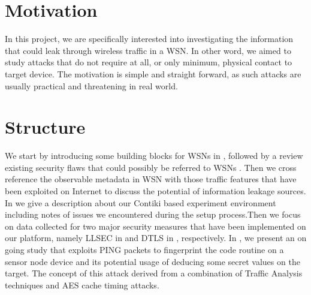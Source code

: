 \section{Motivation}
In this project, we are specifically interested into investigating the information that could leak through wireless traffic in a WSN. In other word, we aimed to study attacks that do not require at all, or only minimum, physical contact to target device. The motivation is simple and straight forward, as such attacks are usually practical and threatening in real world.

\section{Structure}
We start by introducing some building blocks for WSNs in , followed by a review existing security flaws that could possibly be referred to WSNs . Then we cross reference the observable metadata in WSN with those traffic features that have been exploited on Internet to discuss the potential of information leakage sources. In  we give a description about our Contiki\cite{Contiki} based experiment environment including notes of issues we encountered during the setup process.Then we focus on data collected for two major security measures that have been implemented on our platform, namely LLSEC in  and DTLS in , respectively. In , we present an on going study that exploits PING packets to fingerprint the code routine on a sensor node device and its potential usage of deducing some secret values on the target. The concept of this attack derived from a combination of Traffic Analysis techniques and AES cache timing attacks.